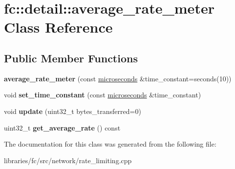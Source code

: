 \hypertarget{classfc_1_1detail_1_1average__rate__meter}{}\section{fc\+:\+:detail\+:\+:average\+\_\+rate\+\_\+meter Class Reference}
\label{classfc_1_1detail_1_1average__rate__meter}
\subsection*{Public Member Functions}
\begin{DoxyCompactItemize}
\item 
\mbox{\label{classfc_1_1detail_1_1average__rate__meter_a2c2e91656d9daa3ba382ca11251bb1c4}} 
{\bfseries average\+\_\+rate\+\_\+meter} (const \mbox{\hyperlink{classfc_1_1microseconds}{microseconds}} \&time\+\_\+constant=seconds(10))
\item 
\mbox{\label{classfc_1_1detail_1_1average__rate__meter_aacdc090efdf58910f9b4626000ff23f3}} 
void {\bfseries set\+\_\+time\+\_\+constant} (const \mbox{\hyperlink{classfc_1_1microseconds}{microseconds}} \&time\+\_\+constant)
\item 
\mbox{\label{classfc_1_1detail_1_1average__rate__meter_ada9b561ff55964f5c3dd3f56a68858dc}} 
void {\bfseries update} (uint32\+\_\+t bytes\+\_\+transferred=0)
\item 
\mbox{\label{classfc_1_1detail_1_1average__rate__meter_abb72c81fbcef39cf923a9e9071b40ef7}} 
uint32\+\_\+t {\bfseries get\+\_\+average\+\_\+rate} () const
\end{DoxyCompactItemize}


The documentation for this class was generated from the following file\+:\begin{DoxyCompactItemize}
\item 
libraries/fc/src/network/rate\+\_\+limiting.\+cpp\end{DoxyCompactItemize}
